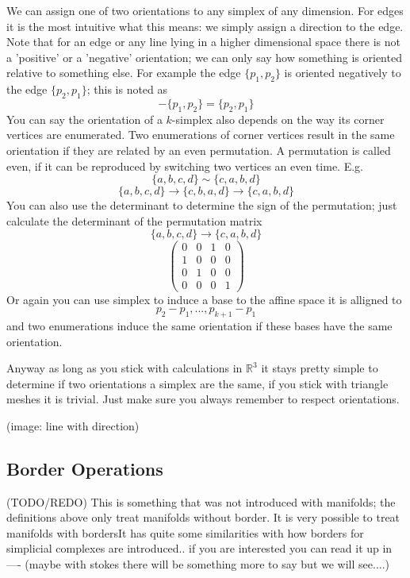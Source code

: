 We can assign one of two orientations to any simplex of any dimension. For edges it is the most intuitive what this means: we simply assign a direction to the edge. Note that for an edge or any line lying in a higher dimensional space there is not a 'positive' or a 'negative' orientation; we can only say how something is oriented relative to something else. For example the edge $\{p_1,p_2\}$ is oriented negatively to the edge $\{p_2,p_1\}$; this is noted as
\[-\{p_1,p_2\} = \{p_2,p_1\}\]
You can say the orientation of a $k$-simplex also depends on the way its corner vertices are enumerated. Two enumerations of corner vertices result in the same orientation if they are related by an even permutation. A permutation is called even, if it can be reproduced by switching two vertices an even time. E.g.
\[\{a,b,c,d\} \sim \{c,a,b,d\}\]
\[\{a,b,c,d\} \rightarrow \{c,b,a,d\}\rightarrow \{c,a,b,d\}\]
You can also use the determinant to determine the sign of the permutation; just calculate the determinant of the permutation matrix
\[\{a,b,c,d\} \rightarrow \{c,a,b,d\}\]
\[\begin{pmatrix} 0 & 0 & 1 &0 \\ 1 &0&0&0 \\ 0&1&0&0 \\ 0&0&0&1 \end{pmatrix}\]
Or again you can use simplex to induce a base to the affine space it is alligned to
\[p_2 -p_1,...,p_{k+1}-p_{1}\]
and two enumerations induce the same orientation if these bases have the same orientation.

Anyway as long as you stick with calculations in $\mathbb R^3$ it stays pretty simple to determine if two orientations a simplex are the same, if you stick with triangle meshes it is trivial. Just make sure you always remember to respect orientations.

(image: line with direction)

\subsection{Border Operations}

(TODO/REDO) This is something that was not introduced with manifolds; the definitions above only treat manifolds without border. It is very possible to treat manifolds with bordersIt has quite some similarities with how borders for simplicial complexes are introduced..  if you are interested you can read it up in---- (maybe with stokes there will be something more to say but we will see....)

